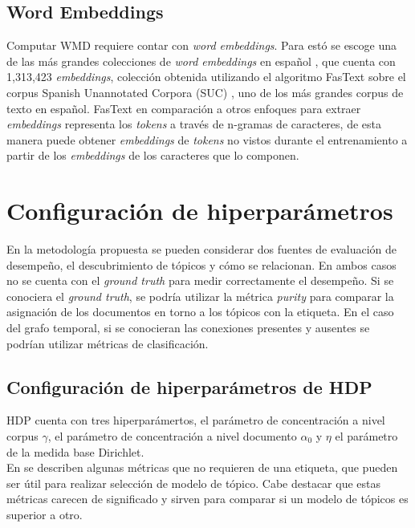 \subsection{Word Embeddings}

Computar WMD requiere contar con \textit{word embeddings}. Para estó se escoge una de las más grandes colecciones de \textit{word embeddings} en español \citep{fastextSUC}, que cuenta con 1,313,423 \textit{embeddings}, colección obtenida utilizando el algoritmo FasText \citep{bojanowski2017enriching} sobre el corpus Spanish Unannotated Corpora (SUC) \citep{josecanneteSUC}, uno de los más grandes corpus de texto en español. FasText en comparación a otros enfoques para extraer \textit{embeddings} representa los \textit{tokens} a través de n-gramas de caracteres, de esta manera puede obtener \textit{embeddings} de \textit{tokens} no vistos durante el entrenamiento a partir de los \textit{embeddings} de los caracteres que lo componen.

\section{Configuración de hiperparámetros}
\label{sec:hiperparameters}

En la metodología propuesta se pueden considerar dos fuentes de evaluación de desempeño, el descubrimiento de tópicos y cómo se relacionan. En ambos casos no se cuenta con el \textit{ground truth} para medir correctamente el desempeño. Si se conociera el \textit{ground truth}, se podría utilizar la métrica \textit{purity} \citep{manning2008introduction} para comparar la asignación de los documentos en torno a los tópicos con la etiqueta. En el caso del grafo temporal, si se conocieran las conexiones presentes y ausentes se podrían utilizar métricas de clasificación.\\

\subsection{Configuración de hiperparámetros de HDP}
\label{sec:hdp_hiperparameters}

HDP cuenta con tres hiperparámertos, el parámetro de concentración a nivel corpus $\gamma$, el parámetro de concentración a nivel documento $\alpha_{0}$ y $\eta$ el parámetro de la medida base Dirichlet.\\

En \citep{blei2003latent,griffiths2004finding,cao2009density,arun2010finding,deveaud2014accurate,zhang2017lda} se describen algunas métricas que no requieren de una etiqueta, que pueden ser útil para realizar selección de modelo de tópico. Cabe destacar que estas métricas carecen de significado y sirven para comparar si un modelo de tópicos es superior a otro.\\

